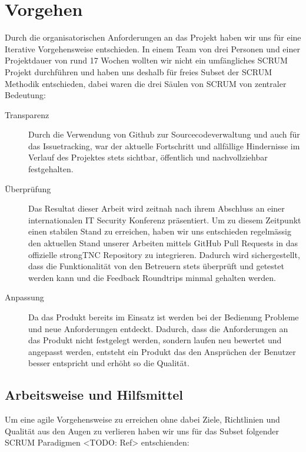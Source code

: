 \chapter{Vorgehen}

Durch die organisatorischen Anforderungen an das Projekt haben wir uns für eine
Iterative Vorgehensweise entschieden. In einem Team von drei Personen und einer
Projektdauer von rund 17 Wochen wollten wir nicht ein umfängliches SCRUM Projekt
durchführen und haben uns deshalb für freies  Subset der SCRUM Methodik
entschieden, dabei waren die drei Säulen von SCRUM von zentraler Bedeutung:

\begin{description}
	\item[Transparenz] Durch die Verwendung von Github zur Sourcecodeverwaltung und
	auch für das Issuetracking, war der aktuelle Fortschritt und allfällige
	Hindernisse im Verlauf des Projektes stets sichtbar, öffentlich und
	nachvollziehbar festgehalten.

	\item[Überprüfung] Das Resultat dieser Arbeit wird zeitnah nach ihrem Abschluss
	an einer internationalen IT Security Konferenz präsentiert. Um zu diesem
	Zeitpunkt einen stabilen Stand zu erreichen, haben wir uns entschieden
	regelmässig den aktuellen Stand unserer Arbeiten mittels GitHub Pull Requests
	in das offizielle strongTNC Repository zu integrieren. Dadurch wird
	sichergestellt, dass die Funktionalität von den Betreuern stets überprüft und
	getestet werden kann und die Feedback Roundtrips minmal gehalten werden.

	\item[Anpassung] Da das Produkt bereits im Einsatz ist werden bei der Bedienung
	Probleme und neue Anforderungen entdeckt. Dadurch, dass die Anforderungen an das
	Produkt nicht festgelegt werden, sondern laufen neu bewertet und angepasst
	werden, entsteht ein Produkt das den Ansprüchen der Benutzer besser entspricht
	und erhöht so die Qualität.

\end{description}

\section{Arbeitsweise und Hilfsmittel}
Um eine agile Vorgehensweise zu erreichen ohne dabei Ziele, Richtlinien und
Qualität aus den Augen zu verlieren haben wir uns für das Subset folgender SCRUM
Paradigmen <TODO: Ref> entschienden:

